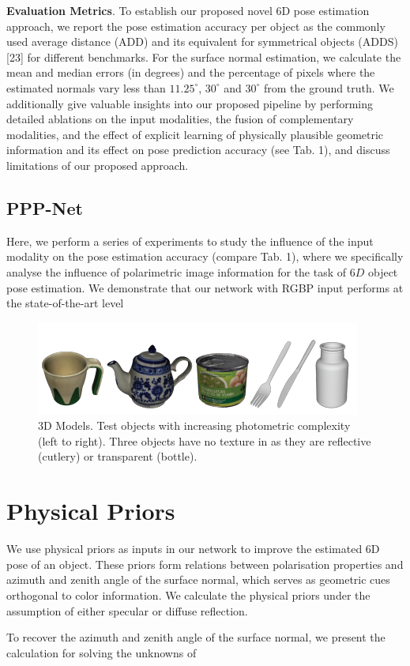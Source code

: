 \documentclass[10pt,twocolumn,letterpaper]{article}
\begin{document}
\textbf{Evaluation Metrics}. To establish our proposed novel 6D pose estimation approach, we report the pose estimation accuracy per object as the commonly used average distance (ADD) and its equivalent for symmetrical objects (ADDS) [23] for different benchmarks. For the surface normal estimation, we calculate the mean and median errors (in degrees) and the percentage of pixels where the estimated normals vary less than $11.25^\circ$, $30^\circ$ and $30^\circ$ from the ground truth. We additionally give valuable insights into our proposed pipeline by performing detailed ablations on the input modalities, the fusion of complementary modalities, and the
effect of explicit learning of physically plausible geometric
information and its effect on pose prediction accuracy (see Tab. 1), and discuss limitations of our proposed approach.
\subsection{PPP-Net}
Here, we perform a series of experiments to study the influence of the input modality on the pose estimation accuracy (compare Tab. 1), where we specifically analyse the influence of polarimetric image information for the task of $6D$ object pose estimation. We demonstrate that our network with RGBP input performs at the state-of-the-art level
\begin{figure}[h]
    \centering
    \includegraphics{image/Capture d'Ã©cran_20230110_145736.png}
    \caption{3D Models. Test objects with increasing photometric complexity (left to right). Three objects have no texture in as they are reflective (cutlery) or transparent (bottle).}
    \label{fig:my_label}
\end{figure}
\renewcommand{\thesection}{\Alph{section}}
\section{ Physical Priors}
We use physical priors as inputs in our network to improve the estimated 6D pose of an object. These priors form relations between polarisation properties and azimuth and zenith angle of the surface normal, which serves as geometric cues orthogonal to color information. We calculate the physical priors under the assumption of either specular or diffuse reflection.

To recover the azimuth and zenith angle of the surface
normal, we present the calculation for solving the unknowns
of

{\small


}
\end{document}

